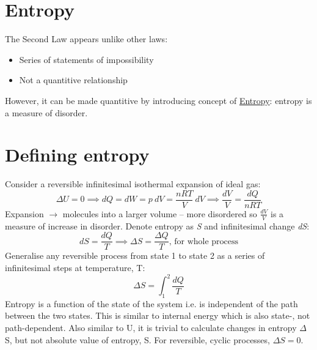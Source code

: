 \documentclass[a4paper, 11pt, normalem]{report}
\begin{document}
\section{Entropy}
The Second Law appears unlike other laws:
\begin{itemize}
	\item Series of statements of impossibility
	\item Not a quantitive relationship
\end{itemize}
However, it can be made quantitive by introducing concept of \underline{Entropy}: entropy is a measure of disorder.

\section{Defining entropy}
Consider a reversible infinitesimal isothermal expansion of ideal gas:
\begin{equation}
	{\Delta}U = 0 \implies dQ = dW = p\:dV = \frac{nRT}{V}\:dV \implies \frac{dV}{V} = \frac{dQ}{nRT}
\end{equation}
Expansion $\rightarrow$ molecules into a larger volume -- more disordered so $\frac{dV}{V}$ is a measure of increase in disorder.
Denote entropy as \emph{S} and infinitesimal change \emph{dS}:
\begin{equation}
	dS = \frac{dQ}{T} \implies {\Delta}S = \frac{{\Delta}Q}{T} \text{, for whole process}
\end{equation}
Generalise any reversible process from state 1 to state 2 as a series of infinitesimal steps at temperature, T:
\begin{equation}
	{\Delta}S = \int_{1}^{2} \frac{dQ}{T}
\end{equation}
Entropy is a function of the state of the system i.e. is independent of the path between the two states.
This is similar to internal energy which is also state-, not path-dependent.
Also similar to U, it is trivial to calculate changes in entropy $\Delta$S, but not absolute value of entropy, S.
For reversible, cyclic processes, ${\Delta}S = 0$.
\end{document}
